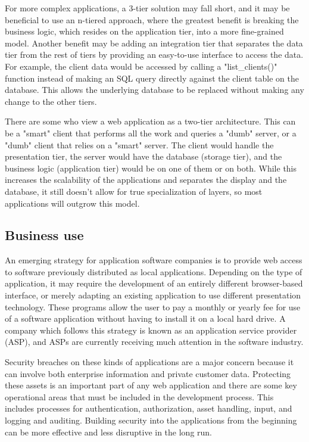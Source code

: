 For more complex applications, a 3-tier solution may fall short, and it may be beneficial to use an n-tiered approach, where the greatest benefit is breaking the business logic, which resides on the application tier, into a more fine-grained model.\cite{krunalMakeNtierArchitecture2008} Another benefit may be adding an integration tier that separates the data tier from the rest of tiers by providing an easy-to-use interface to access the data. For example, the client data would be accessed by calling a "list\_clients()" function instead of making an SQL query directly against the client table on the database. This allows the underlying database to be replaced without making any change to the other tiers.

There are some who view a web application as a two-tier architecture. This can be a "smart" client that performs all the work and queries a "dumb" server, or a "dumb" client that relies on a "smart" server. The client would handle the presentation tier, the server would have the database (storage tier), and the business logic (application tier) would be on one of them or on both.\cite{krunalMakeNtierArchitecture2008} While this increases the scalability of the applications and separates the display and the database, it still doesn't allow for true specialization of layers, so most applications will outgrow this model.

\subsection{Business use}

An emerging strategy for application software companies is to provide web access to software previously distributed as local applications. Depending on the type of application, it may require the development of an entirely different browser-based interface, or merely adapting an existing application to use different presentation technology. These programs allow the user to pay a monthly or yearly fee for use of a software application without having to install it on a local hard drive. A company which follows this strategy is known as an application service provider (ASP), and ASPs are currently receiving much attention in the software industry.

Security breaches on these kinds of applications are a major concern because it can involve both enterprise information and private customer data. Protecting these assets is an important part of any web application and there are some key operational areas that must be included in the development process. This includes processes for authentication, authorization, asset handling, input, and logging and auditing. Building security into the applications from the beginning can be more effective and less disruptive in the long run.

